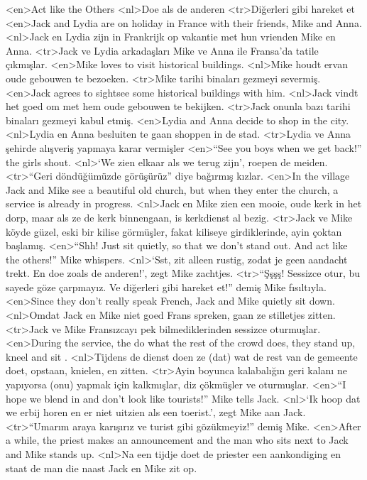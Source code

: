 <en>Act like the Others 
<nl>Doe als de anderen 
<tr>Diğerleri gibi hareket et 
<en>Jack and Lydia are on holiday in France with their friends, Mike and Anna.
<nl>Jack en Lydia zijn  in Frankrijk op vakantie met hun vrienden Mike en Anna.
<tr>Jack ve Lydia arkadaşları Mike ve Anna ile Fransa’da tatile çıkmışlar. 
<en>Mike loves to visit historical buildings. 
<nl>Mike houdt ervan  oude gebouwen te bezoeken.
<tr>Mike tarihi binaları gezmeyi severmiş. 
<en>Jack agrees to sightsee some historical buildings with him.
<nl>Jack vindt het goed om met hem oude gebouwen te bekijken.
<tr>Jack onunla bazı tarihi binaları gezmeyi kabul etmiş. 
<en>Lydia and Anna decide to shop in the city. 
<nl>Lydia en Anna besluiten  te gaan shoppen in de stad.
<tr>Lydia ve Anna şehirde alışveriş yapmaya karar vermişler
<en>“See you boys when we get back!” the girls shout.
<nl>`We zien elkaar als we terug zijn', roepen de meiden.
<tr>“Geri döndüğümüzde görüşürüz” diye bağırmış kızlar.
<en>In the village Jack and Mike see a beautiful old church, but when they enter the church, a service is already in progress.
<nl>Jack en Mike zien een mooie, oude kerk in het dorp, maar als  ze de kerk  binnengaan, is  kerkdienst al bezig.
<tr>Jack ve Mike köyde güzel, eski bir kilise görmüşler, fakat kiliseye girdiklerinde, ayin çoktan başlamış. 
<en>“Shh! Just sit quietly, so that we don’t stand out. And act like the others!” Mike whispers.
<nl>`Sst, zit alleen rustig, zodat je geen aandacht trekt. En doe zoals de anderen!', zegt  Mike zachtjes.  
<tr>“Şşşş! Sessizce otur, bu sayede göze çarpmayız.  Ve diğerleri gibi hareket et!” demiş Mike fısıltıyla. 
<en>Since they don’t really speak French, Jack and Mike quietly sit down. 
<nl>Omdat Jack en Mike niet goed Frans spreken, gaan ze stilletjes zitten.
<tr>Jack ve Mike Fransızcayı pek bilmediklerinden sessizce oturmuşlar. 
<en>During the service, the do what the rest of the crowd does,  they stand up, kneel and sit .
<nl>Tijdens  de dienst doen ze (dat) wat de rest van de gemeente doet, opstaan, knielen, en zitten. 
<tr>Ayin boyunca kalabalığın geri kalanı ne yapıyorsa (onu) yapmak için kalkmışlar, diz çökmüşler ve oturmuşlar. 
<en>“I hope we blend in and don’t look like tourists!” Mike tells Jack.
<nl>`Ik hoop dat we erbij horen en er niet uitzien als een toerist.', zegt Mike aan Jack.
<tr>“Umarım araya karışırız ve turist gibi gözükmeyiz!” demiş Mike. 
<en>After a while, the priest makes an announcement and the man who sits next to Jack and Mike stands up.
<nl>Na een tijdje doet de priester een aankondiging en staat de man die naast Jack en Mike zit op. 
